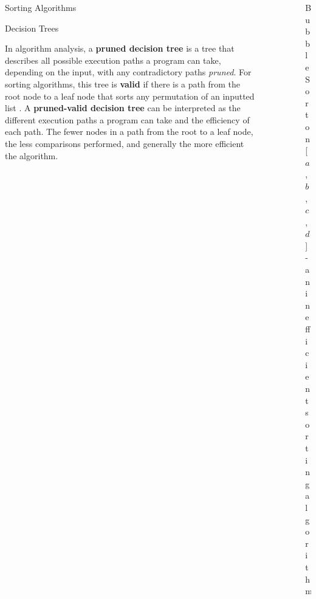 \documentclass[final]{beamer}
\newlength{\sepwid}
\newlength{\onecolwid}
\newlength{\twocolwid}
\begin{document}
\begin{frame}[t]
\begin{columns}[t]
\begin{column}{\onecolwid}
\begin{block}{Sorting Algorithms}
\end{block}


\begin{block}{Decision Trees}

In algorithm analysis, a \textbf {pruned decision tree} is a tree that describes all possible
execution paths a program can take, depending on the input, with any contradictory paths
\textit{pruned}. For sorting algorithms, this tree is \textbf{valid} if there is a path from the
root node to a leaf node that sorts any permutation of an inputted list \cite{neapolitan:2015}. A
\textbf{pruned-valid decision tree} can be interpreted as the different execution paths a program
can take and the efficiency of each path. The fewer nodes in a path from the root to a leaf node,
the less comparisons performed, and generally the more efficient the algorithm.

\end{block}


\end{column} %

\begin{column}{\sepwid}\end{column} %

\begin{column}{\twocolwid} %


\begin{figure}
\resizebox{0.9\linewidth}{!}{}
\caption{Bubble Sort on [$a$, $b$, $c$, $d$] - an inefficient sorting algorithm}
\end{figure}




\end{column}
\end{columns}
\end{frame}
\end{document}
